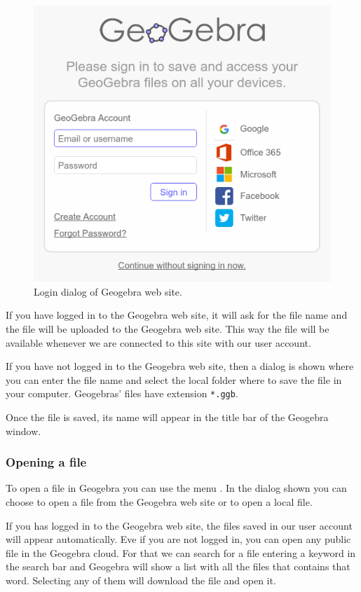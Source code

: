 \begin{figure}[h!]
\begin{center}
\includegraphics[scale=0.6]{img/introduction/login}
\caption{Login dialog of Geogebra web site.} \label{g:login}
\end{center}
\end{figure}

If you have logged in to the Geogebra web site, it will ask for the file name and the file will be uploaded to the Geogebra web site.
This way the file will be available whenever we are connected to this site with our user account.

If you have not logged in to the Geogebra web site, then a dialog is shown where you can enter the file name and select the local folder where to save the file in your computer.
Geogebras' files have extension \texttt{*.ggb}.

Once the file is saved, its name will appear in the title bar of the Geogebra window.


\subsubsection*{Opening a file}
To open a file in Geogebra you can use the menu .
In the dialog shown you can choose to open a file from the Geogebra web site or to open a local file.

If you has logged in to the Geogebra web site, the files saved in our user account will appear automatically.
Eve if you are not logged in, you can open any public file in the Geogebra cloud.
For that we can search for a file entering a keyword in the search bar and Geogebra will show a list with all the files that contains that word.
Selecting any of them will download the file and open it.

